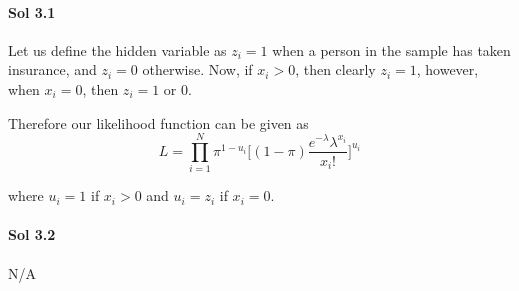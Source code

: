 \documentclass[]{report}
\begin{document}
\paragraph{Sol 3.1}
	Let us define the hidden variable as $z_i = 1$ when a person in the sample has taken insurance, and $z_i = 0$ otherwise. Now, if $x_i > 0$, then clearly $z_i = 1$, however, when $x_i = 0$, then $z_i = 1$ or $0$.

	Therefore our likelihood function can be given as 
	\[ 
		L = \prod_{i=1}^N \pi^{1-u_i} \big[ (1 - \pi) \frac{e^{-\lambda} \lambda^{x_i}}{x_i!} \big]^{u_i}
	\]

	where $u_i = 1$ if $x_i > 0$ and $u_i = z_i$ if $x_i = 0$.

\paragraph{Sol 3.2} N/A
\end{document}

